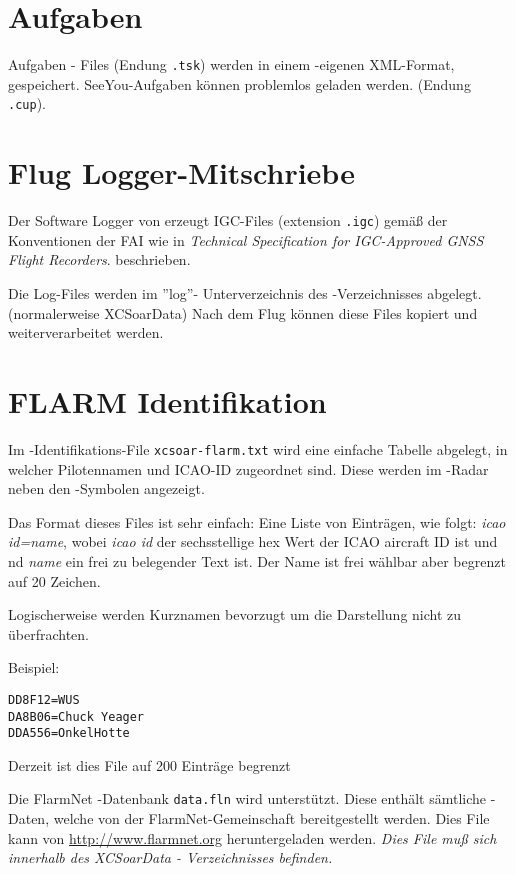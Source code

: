 \section{Aufgaben }

Aufgaben - Files  (Endung \verb|.tsk|) werden in einem \xc -eigenen  XML-Format, gespeichert.
SeeYou-Aufgaben können problemlos geladen werden. (Endung \verb|.cup|).

\section{Flug Logger-Mitschriebe} \label{sec:logfiles}
Der Software Logger von \xc erzeugt  IGC-Files (extension \verb|.igc|)
gemäß der Konventionen der FAI wie in  {\em Technical Specification for IGC-Approved GNSS Flight Recorders}.
beschrieben.

Die Log-Files werden  im ''log''- Unterverzeichnis des \xc -Verzeichnisses abgelegt. (normalerweise XCSoarData)
Nach dem Flug können diese Files kopiert und weiterverarbeitet werden.

\section{FLARM Identifikation}\label{sec:flarm-ident-file}

Im  \fl-Identifikations-File  \verb|xcsoar-flarm.txt| wird eine einfache Tabelle
abgelegt, in welcher Pilotennamen und ICAO-ID zugeordnet sind.
Diese werden im \fl-Radar neben den \fl-Symbolen angezeigt.

Das Format dieses Files ist sehr einfach: Eine Liste von Einträgen, wie folgt:
{\em icao id=name}, wobei {\em icao id} der sechsstellige hex Wert der ICAO
aircraft ID ist und  nd {\em name} ein frei zu belegender Text ist.
Der Name ist frei wählbar aber  begrenzt auf 20 Zeichen.

Logischerweise werden Kurznamen bevorzugt um die Darstellung nicht zu überfrachten.

Beispiel:
\begin{verbatim}
DD8F12=WUS
DA8B06=Chuck Yeager
DDA556=OnkelHotte
\end{verbatim}

Derzeit ist dies File auf 200 Einträge begrenzt

Die  FlarmNet -Datenbank \verb|data.fln| wird unterstützt.
Diese enthält sämtliche \fl-Daten, welche von der \textsf{\textsf{FlarmNet}}-Gemeinschaft bereitgestellt werden.
Dies File kann von  \url{http://www.flarmnet.org}  heruntergeladen werden.
\textsl{Dies File muß sich innerhalb des XCSoarData - Verzeichnisses befinden.}

